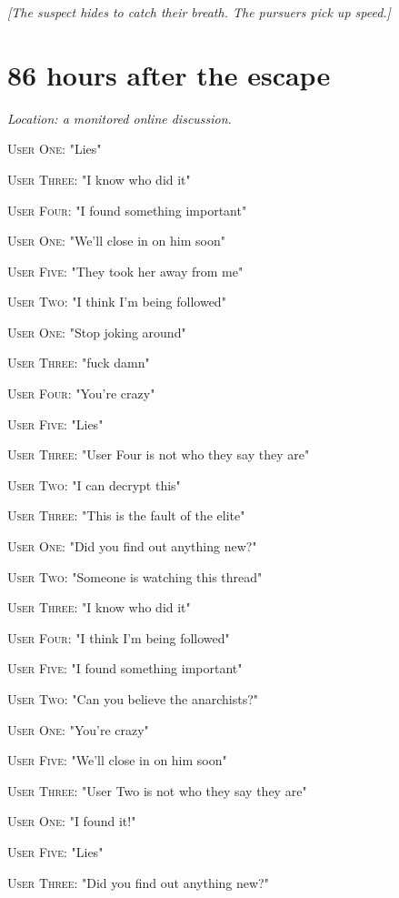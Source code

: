 \documentclass{report}
\begin{document}
\textit{[The suspect hides to catch their breath. The pursuers pick up speed.]}


\section*{86 \small{hours after the escape}}

\textit{Location: a monitored online discussion}. 

\textsc{User One}: "Lies" 

\textsc{User Three}: "I know who did it" 

\textsc{User Four}: "I found something important" 

\textsc{User One}: "We'll close in on him soon" 

\textsc{User Five}: "They took her away from me" 

\textsc{User Two}: "I think I'm being followed" 

\textsc{User One}: "Stop joking around" 

\textsc{User Three}: "fuck damn" 

\textsc{User Four}: "You're crazy" 

\textsc{User Five}: "Lies" 

\textsc{User Three}: "User Four is not who they say they are" 

\textsc{User Two}: "I can decrypt this" 

\textsc{User Three}: "This is the fault of the elite" 

\textsc{User One}: "Did you find out anything new?" 

\textsc{User Two}: "Someone is watching this thread" 

\textsc{User Three}: "I know who did it" 

\textsc{User Four}: "I think I'm being followed" 

\textsc{User Five}: "I found something important" 

\textsc{User Two}: "Can you believe the anarchists?" 

\textsc{User One}: "You're crazy" 

\textsc{User Five}: "We'll close in on him soon" 

\textsc{User Three}: "User Two is not who they say they are" 

\textsc{User One}: "I found it!" 

\textsc{User Five}: "Lies" 

\textsc{User Three}: "Did you find out anything new?" 
\end{document}
